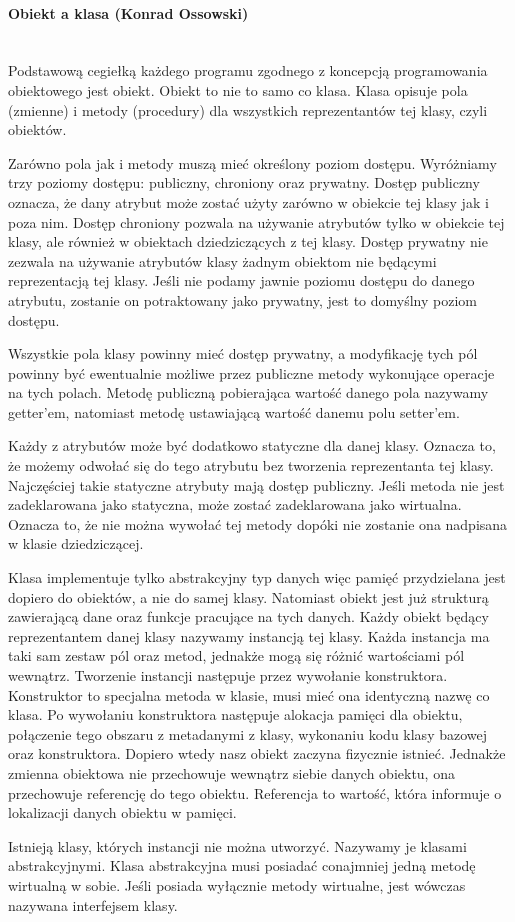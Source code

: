 \paragraph{Obiekt a klasa (Konrad Ossowski)}\mbox{}\\
Podstawową cegiełką każdego programu zgodnego z koncepcją programowania obiektowego jest obiekt. Obiekt to nie to samo co klasa. Klasa opisuje pola (zmienne) i metody (procedury) dla wszystkich reprezentantów tej klasy, czyli obiektów.\par Zarówno pola jak i metody muszą mieć określony poziom dostępu. Wyróżniamy trzy poziomy dostępu: publiczny, chroniony oraz prywatny. Dostęp publiczny oznacza, że dany atrybut może zostać użyty zarówno w obiekcie tej klasy jak i poza nim. Dostęp chroniony pozwala na używanie atrybutów tylko w obiekcie tej klasy, ale również w obiektach dziedziczących z tej klasy. Dostęp prywatny nie zezwala na używanie atrybutów klasy żadnym obiektom nie będącymi reprezentacją tej klasy. Jeśli nie podamy jawnie poziomu dostępu do danego atrybutu, zostanie on potraktowany jako prywatny, jest to domyślny poziom dostępu.\par Wszystkie pola klasy powinny mieć dostęp prywatny, a modyfikację tych pól powinny być ewentualnie możliwe przez publiczne metody wykonujące operacje na tych polach. Metodę publiczną pobierająca wartość danego pola nazywamy getter'em, natomiast metodę ustawiającą wartość danemu polu setter'em.\par Każdy z atrybutów może być dodatkowo statyczne dla danej klasy. Oznacza to, że możemy odwołać się do tego atrybutu bez tworzenia reprezentanta tej klasy. Najczęściej takie statyczne atrybuty mają dostęp publiczny. Jeśli metoda nie jest zadeklarowana jako statyczna, może zostać zadeklarowana jako wirtualna. Oznacza to, że nie można wywołać tej metody dopóki nie zostanie ona nadpisana w klasie dziedziczącej.\par Klasa implementuje tylko abstrakcyjny typ danych więc pamięć przydzielana jest dopiero do obiektów, a nie do samej klasy. Natomiast obiekt jest już strukturą zawierającą dane oraz funkcje pracujące na tych danych. Każdy obiekt będący reprezentantem danej klasy nazywamy instancją tej klasy. Każda instancja ma taki sam zestaw pól oraz metod, jednakże mogą się różnić wartościami pól wewnątrz. Tworzenie instancji następuje przez wywołanie konstruktora. Konstruktor to specjalna metoda w klasie, musi mieć ona identyczną nazwę co klasa. Po wywołaniu konstruktora następuje alokacja pamięci dla obiektu, połączenie tego obszaru z metadanymi z klasy, wykonaniu kodu klasy bazowej oraz konstruktora. Dopiero wtedy nasz obiekt zaczyna fizycznie istnieć. Jednakże zmienna obiektowa nie przechowuje wewnątrz siebie danych obiektu, ona przechowuje referencję do tego obiektu. Referencja to wartość, która informuje o lokalizacji danych obiektu w pamięci.\par Istnieją klasy, których instancji nie można utworzyć. Nazywamy je klasami abstrakcyjnymi. Klasa abstrakcyjna musi posiadać conajmniej jedną metodę wirtualną w sobie. Jeśli posiada wyłącznie metody wirtualne, jest wówczas nazywana interfejsem klasy.


